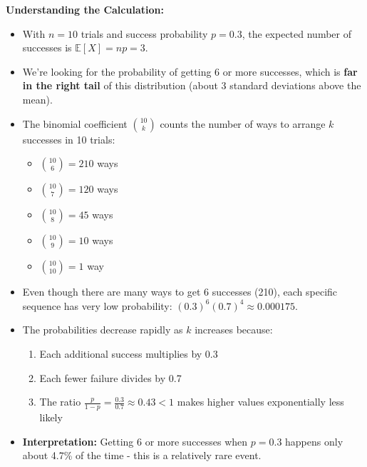 \documentclass[12pt]{article}
\begin{document}
\begin{explanation}
\textbf{Understanding the Calculation:}

\begin{itemize}
    \item With \(n = 10\) trials and success probability \(p = 0.3\), the expected number of successes is \(\mathbb{E}[X] = np = 3\).

    \item We're looking for the probability of getting 6 or more successes, which is \textbf{far in the right tail} of this distribution (about 3 standard deviations above the mean).

    \item The binomial coefficient \(\binom{10}{k}\) counts the number of ways to arrange \(k\) successes in 10 trials:
    \begin{itemize}
        \item \(\binom{10}{6} = 210\) ways
        \item \(\binom{10}{7} = 120\) ways
        \item \(\binom{10}{8} = 45\) ways
        \item \(\binom{10}{9} = 10\) ways
        \item \(\binom{10}{10} = 1\) way
    \end{itemize}

    \item Even though there are many ways to get 6 successes (210), each specific sequence has very low probability: \((0.3)^6(0.7)^4 \approx 0.000175\).

    \item The probabilities decrease rapidly as \(k\) increases because:
    \begin{enumerate}
        \item Each additional success multiplies by 0.3
        \item Each fewer failure divides by 0.7
        \item The ratio \(\frac{p}{1-p} = \frac{0.3}{0.7} \approx 0.43 < 1\) makes higher values exponentially less likely
    \end{enumerate}

    \item \textbf{Interpretation:} Getting 6 or more successes when \(p = 0.3\) happens only about 4.7\% of the time - this is a relatively rare event.
\end{itemize}
\end{explanation}
\end{document}
